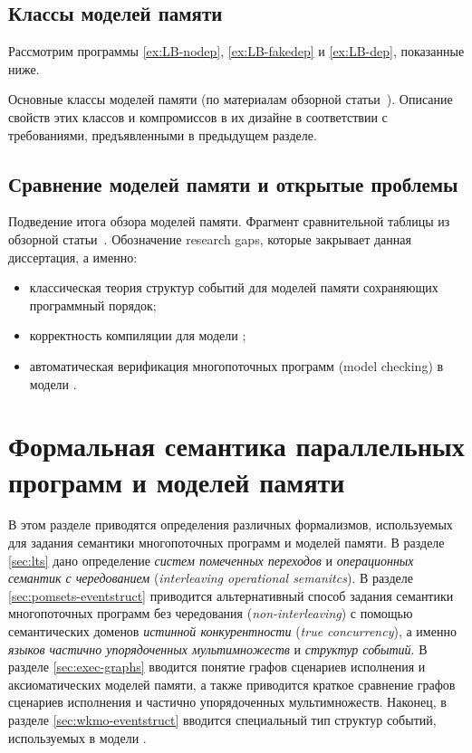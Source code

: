 \subsection{Классы моделей памяти}
\label{sec:models-classes}

Рассмотрим программы \ref{ex:LB-nodep}, \ref{ex:LB-fakedep} и \ref{ex:LB-dep}, 
показанные ниже. \TODO{}



Основные классы моделей памяти (по материалам обзорной статьи~\cite{Moiseenko-al:PCS21}).
Описание свойств этих классов и компромиссов в их дизайне
в соответствии с требованиями, предъявленными в предыдущем разделе. 

\subsection{Сравнение моделей памяти и открытые проблемы}
\label{sec:models-summary}

Подведение итога обзора моделей памяти.
Фрагмент сравнительной таблицы из обзорной статьи~\cite{Moiseenko-al:PCS21}.
Обозначение research gaps, которые закрывает данная диссертация, а именно:

\begin{itemize}
  \item классическая теория структур событий для моделей памяти
    сохраняющих программный порядок;
  \item корректность компиляции для модели \Wkm;
  \item автоматическая верификация многопоточных программ
    (model checking) в модели \WkmS.
\end{itemize}

\section{Формальная семантика параллельных программ и моделей памяти}

В этом разделе приводятся определения различных формализмов,
используемых для задания семантики многопоточных программ и моделей памяти.
В разделе \cref{sec:lts} дано определение \emph{систем помеченных переходов}
и \emph{операционных семантик с чередованием} 
(\emph{interleaving operational semanitcs}).
В разделе \cref{sec:pomsets-eventstruct} приводится альтернативный способ
задания семантики многопоточных программ без чередования 
(\emph{non-interleaving}) 
с помощью семантических доменов \emph{истинной конкурентности} 
(\emph{true concurrency}), а именно 
\emph{языков частично упорядоченных мультимножеств} и \emph{структур событий}.
В разделе \cref{sec:exec-graphs} вводится понятие графов сценариев исполнения
и аксиоматических моделей памяти, а также приводится краткое сравнение
графов сценариев исполнения и частично упорядоченных мультимножеств.
Наконец, в разделе \cref{sec:wkmo-eventstruct} вводится
специальный тип структур событий, используемых в модели \Wkm.

